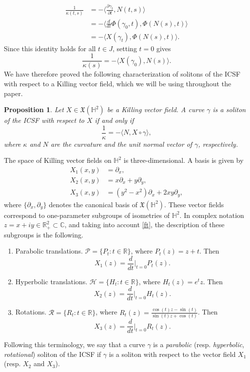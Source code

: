 \documentclass[12pt]{amsart}
\theoremstyle{plain}
\newtheorem{proposition}[theorem]{Proposition}
\theoremstyle{definition}
\def\h{\mathbb H}
\def\r{\mathbb R}
\begin{document}
\begin{equation*}
\begin{split}
\frac{1}{\kappa(t,s)}&=- \langle \frac{\partial \gamma_t}{\partial t}, N(t,s)\rangle \\
		       & = -\langle \frac{d}{dt}\Phi(\gamma_0,t),  \Phi(N(s),t)\rangle \\
		       & =- \langle X(\gamma_t), \Phi(N(s),t) \rangle.
\end{split}
\end{equation*}
Since this identity holds for all $t\in J$, setting $t=0$ gives 
$$\frac{1}{\kappa(s)}=-\langle X(\gamma_0),N(s)\rangle.$$
We have therefore proved the following characterization of solitons of the ICSF with respect to a Killing vector field, which we will be using throughout the paper.

\begin{proposition}
Let $X\in\mathfrak{X}(\h^2)$ be a Killing vector field. A curve $\gamma$ is a soliton of the ICSF with respect to $X$ if and only if 
\begin{equation}\label{soliton}
\frac{1}{\kappa}=-\langle N,X\circ\gamma\rangle,
\end{equation}
where $\kappa$ and $N$ are the curvature and the unit normal vector of $\gamma$, respectively.
\end{proposition}

The space of Killing vector fields on $\h^2$ is three-dimensional. A basis is given by 
\begin{equation}\label{kv}
\begin{split}
 X_1(x,y)&=\partial_x,\\
 X_2(x,y)&=x\partial_x+y\partial_y,\\
 X_3(x,y)&=(y^2-x^2)\partial_x+2xy\partial_y,
 \end{split}
\end{equation}
where $\{\partial_x,\partial_y \}$ denotes the canonical basis of  $\mathfrak{X}(\h^2)$. These vector fields correspond to one-parameter subgroups of isometries of $\h^2$. In complex notation $z=x+iy\in\r^2_+\subset\mathbb{C}$, and taking into account \eqref{ft}, the description of these subgroups is the following.
\begin{enumerate}
\item Parabolic translations. $\mathcal{P}=\{P_t\colon t\in\r\}$, where $P_t(z) = z + t$. Then 
$$X_1(z)=\frac{d}{dt}{\Big|}_{t=0}P_t(z).$$
\item Hyperbolic translations. $\mathcal{H}=\{H_t\colon t\in\r\}$, where $H_t(z) = e^{t}z$. Then 
$$X_2(z)=\frac{d}{dt}{\Big|}_{t=0}H_t(z).$$ 
\item Rotations. $\mathcal{R}=\{ R_t\colon t\in\r\}$, where $R_t(z) = \frac{\cos(t)z - \sin(t)}{\sin(t)z +\cos(t)}$. Then $$X_3(z)=\frac{d}{dt}{\Big|}_{t=0}R_t(z).$$
\end{enumerate}
 Following this terminology, we say that a curve $\gamma$ is a \emph{parabolic} (resp. \emph{hyperbolic}, \emph{rotational}) soliton of the ICSF if $\gamma$ is a soliton with respect to the vector field $X_1$ (resp. $X_2$ and $X_3$).
\end{document}
